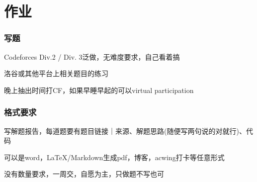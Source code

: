 \documentclass{beamer}
\begin{document}
  \section{作业}
  \begin{frame}
    \frametitle{写题}
    Codeforces Div.2 / Div. 3泛做，无难度要求，自己看着搞

    \vspace*{1\baselineskip}
    
    洛谷或其他平台上相关题目的练习

    \vspace*{1\baselineskip}

    晚上抽出时间打CF，如果早睡早起的可以virtual participation
  \end{frame}

  \begin{frame}[fragile]
    \frametitle{格式要求}

    写解题报告，每道题要有题目链接｜来源、解题思路(随便写两句说的对就行)、代码

    \vspace*{1\baselineskip}
    
    可以是word，\LaTeX/Markdown生成pdf，博客，acwing打卡等任意形式

    \vspace*{1\baselineskip}

    没有数量要求，一周交，自愿为主，只做题不写也可
  \end{frame}
\end{document}
